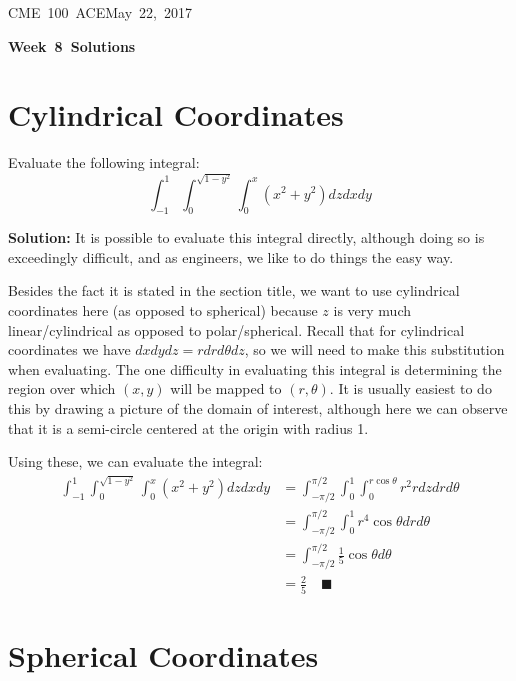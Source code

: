 \documentclass[letterpaper, 11pt]{article}
\makeatletter
\newcommand{\hmwkTitle}{Week\ 8\ Solutions} %
\newcommand{\hmwkClass}{CME\ 100\ ACE} %
\newcommand{\hmwkAuthorName}{Timothy Anderson} %
\newcommand{\hmwkAuthorEmail}{timmya@stanford.edu} %
\makeatother
\begin{document}
\noindent
\normalsize 
\hmwkClass \hfill May\ 22,\ 2017\\

\begin{center} \Large \textbf{\hmwkTitle} \end{center}

\section{Cylindrical Coordinates}
Evaluate the following integral:
\[ \int_{-1}^1 \int_0^{\sqrt{1 - y^2}} \int_0^x (x^2 + y^2) dz dx dy \]
\par \textbf{Solution:} It is possible to evaluate this integral directly, although doing so is exceedingly difficult, and as engineers, we like to do things the easy way. 
\par Besides the fact it is stated in the section title, we want to use cylindrical coordinates here (as opposed to spherical) because $z$ is very much linear/cylindrical as opposed to polar/spherical. Recall that for cylindrical coordinates we have $dxdydz = r dr d\theta dz$, so we will need to make this substitution when evaluating. The one difficulty in evaluating this integral is determining the region over which $(x,y)$ will be mapped to $(r, \theta)$. It is usually easiest to do this by drawing a picture of the domain of interest, although here we can observe that it is a semi-circle centered at the origin with radius 1. 
\par Using these, we can evaluate the integral:
\begin{align*}
\int_{-1}^1 \int_0^{\sqrt{1 - y^2}} \int_0^x (x^2 + y^2) dz dx dy &= \int_{-\pi/2}^{\pi/2} \int_0^1 \int_0^{r \cos \theta} r^2 r dz dr d\theta \\
&= \int_{-\pi/2}^{\pi/2} \int_0^1 r^4 \cos \theta dr d\theta \\
&= \int_{-\pi/2}^{\pi/2} \frac{1}{5} \cos \theta d \theta \\
&= \frac{2}{5} \quad\blacksquare 
\end{align*}


\section{Spherical Coordinates}
\end{document}
